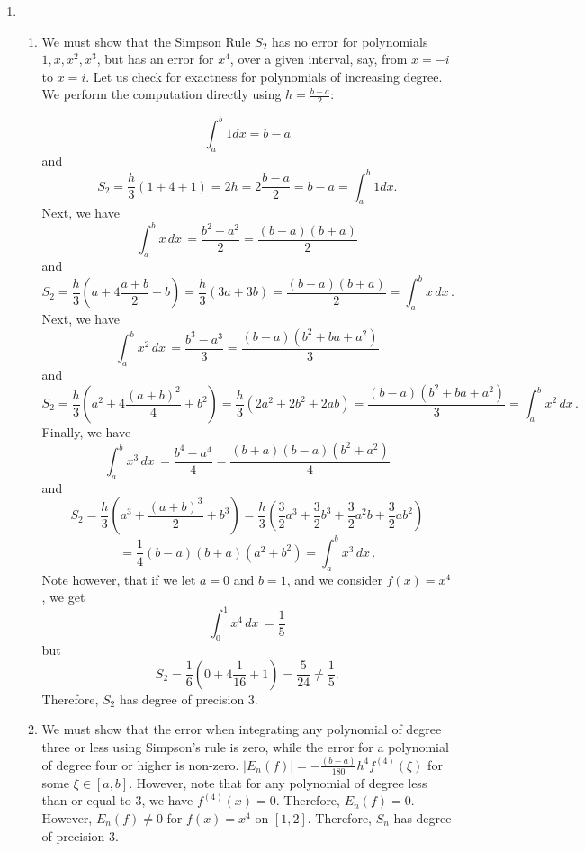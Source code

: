 \documentclass[12pt]{article}
\begin{document}
\begin{enumerate}[leftmargin=2em]
    \item 
    \begin{enumerate}[leftmargin=!]
        \item We must show that the Simpson Rule $S_2$ has no error for polynomials $1, x, x^{2}, x^{3}$, but has an error for $x^{4}$, over a given interval, say, from $x = -i$ to $x = i$. Let us check for exactness for polynomials of increasing degree.
        We perform the computation directly using $h=\frac{b-a}{2}$:

        \[\int_{a}^{b} 1 dx = b - a\]
        and 
        \[S_2 = \frac{h}{3}\left(1+4+1\right)=2h=2\frac{b-a}{2}=b-a=\int_{a}^{b} 1dx.\]
        Next, we have
        \[\int_{a}^{b} x \, dx\, = \frac{b^2-a^2}{2} = \frac{(b-a)(b+a)}{2}\]
        and
        \[S_2 = \frac{h}{3}\left(a+4\frac{a+b}{2}+b\right)=\frac{h}{3}\left(3a+3b\right)=\frac{(b-a)(b+a)}{2}=\int_{a}^{b}x \, dx\,.\]
        Next, we have
        \[\int_{a}^{b} x^2 \, dx\, = \frac{b^3-a^3}{3}=\frac{(b-a)(b^2+ba+a^2)}{3}\]
        and 
        \[S_2 = \frac{h}{3}\left(a^2+4\frac{{(a+b)}^2}{4}+b^2\right) = \frac{h}{3}(2a^2+2b^2+2ab)= \frac{(b-a)(b^2+ba+a^2)}{3} = \int_{a}^{b} x^2\, dx\,.\]
        Finally, we have
        \[\int_{a}^{b} x^3 \, dx\, = \frac{b^4-a^4}{4} = \frac{(b+a)(b-a)(b^2+a^2)}{4}\]
        and
        \[S_2 = \frac{h}{3}\left(a^3+\frac{{(a+b)}^3}{2}+b^3\right) = \frac{h}{3}\left(\frac{3}{2}a^3+\frac{3}{2}b^3+\frac{3}{2}a^2b+\frac{3}{2}ab^2\right)\]
        \[=\frac{1}{4}(b-a)(b+a)(a^2+b^2)=\int_{a}^{b} x^3 \, dx\,.\]
        Note however, that if we let $a=0$ and $b=1$, and we consider $f(x)=x^4$, we get
        \[\int_{0}^{1} x^4\, dx\, = \frac{1}{5}\]
        but
        \[S_2= \frac{1}{6}\left(0+4\frac{1}{16}+1\right)=\frac{5}{24}\neq \frac{1}{5}.\]
        Therefore, $S_2$ has degree of precision $3$.
    
        \item We must show that the error when integrating any polynomial of degree three or less using Simpson's rule is zero, while the error for a polynomial of degree four or higher is non-zero.
        \(|E_{n}(f)| = -\frac{(b-a)}{180}h^{4}f^{(4)}(\xi)\) for some $\xi\in[a,b]$. However, note that for any polynomial of degree less than or equal to $3$, we have $f^{(4)}(x)=0$. Therefore, $E_n(f)=0$. However, $E_n(f)\neq 0$ for $f(x)=x^4$ on $[1,2]$. Therefore, $S_n$ has degree of precision $3$.


\end{enumerate}
\end{enumerate}
\end{document}
